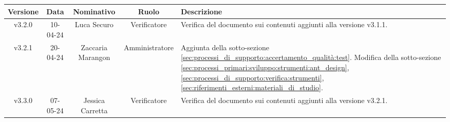 \newpage
\begin{table}[h]
    \centering
    \renewcommand\tabularxcolumn[1]{m{#1}} %
    \renewcommand{\arraystretch}{1.5}
    \begin{tabularx}{0.98\textwidth}
        {c|c|c|c|>{\centering\arraybackslash}X}
        \rowcolor{black}
        \textbf{\color{white} Versione} & \textbf{\color{white} Data} & \textbf{\color{white} Nominativo} & \textbf{\color{white} Ruolo} & \textbf{\color{white} Descrizione} \\ 
        \hline
        v3.2.0 & 10-04-24 & Luca Securo & Verificatore & Verifica del documento sui contenuti aggiunti alla versione v3.1.1.\\
        v3.2.1 & 20-04-24 & Zaccaria Marangon & Amministratore & Aggiunta della sotto-sezione \ref{sec:processi_di_supporto:accertamento_qualità:test}. Modifica della sotto-sezione \ref{sec:processi_primari:sviluppo:strumenti:ant_design}, \ref{sec:processi_di_supporto:verifica:strumenti}, \ref{sec:riferimenti_esterni:materiali_di_studio}.\\
        v3.3.0 & 07-05-24 & Jessica Carretta & Verificatore & Verifica del documento sui contenuti aggiunti alla versione v3.2.1.\\
        \hline
    \end{tabularx}
\end{table}